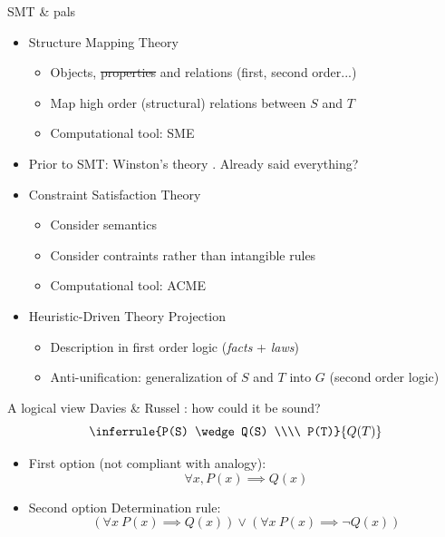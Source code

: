 \documentclass{beamer}
\begin{document}
\begin{frame}{SMT \& pals}
  \begin{itemize}
    \item Structure Mapping Theory \cite{Gen83}
      \begin{itemize}
        \item Objects, \sout{properties} and relations (first, second order...)
        \item Map \alert{high order} (structural) relations between $S$ and $T$
        \item Computational tool: SME
      \end{itemize}
      \pause
    \item Prior to SMT: Winston's theory \cite{Win80}. Already said everything?
      \pause
    \item Constraint Satisfaction Theory \cite{HolTha89}
      \begin{itemize}
        \item Consider semantics
        \item Consider \alert{contraints} rather than intangible rules
        \item Computational tool: ACME
      \end{itemize}
      \pause
    \item Heuristic-Driven Theory Projection \cite{GusKunSchTCS06}
      \begin{itemize}
        \item Description in first order logic (\textit{facts} + \textit{laws})
        \item Anti-unification: \alert{generalization} of $S$ and $T$ into $G$
          (second order logic)
      \end{itemize}
  \end{itemize}
\end{frame}

\begin{frame}{A logical view}
  Davies \& Russel \cite{DavRus87}: how could it be sound?
  $$\inferrule{P(S) \wedge Q(S) \\\\ P(T)}{Q(T)}$$

  \begin{itemize}
    \item First option (not compliant with analogy):
      $$\forall x, P(x) \implies Q(x)$$
    \item Second option \alert{Determination rule}:
      $$\left(\forall x ~ P(x) \implies Q(x)\right) \vee \left(\forall x ~ P(x)
      \implies \neg Q(x)\right)$$
  \end{itemize}
\end{frame}
\end{document}

